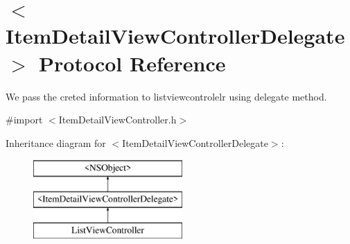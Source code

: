\hypertarget{protocol_item_detail_view_controller_delegate-p}{\section{$<$Item\-Detail\-View\-Controller\-Delegate$>$ Protocol Reference}
\label{protocol_item_detail_view_controller_delegate-p}
}


We pass the creted information to listviewcontrolelr using delegate method.  




{\ttfamily \#import $<$Item\-Detail\-View\-Controller.\-h$>$}

Inheritance diagram for $<$Item\-Detail\-View\-Controller\-Delegate$>$\-:\begin{figure}[H]
\begin{center}
\leavevmode
\includegraphics[height=3.000000cm]{protocol_item_detail_view_controller_delegate-p}
\end{center}
\end{figure}
